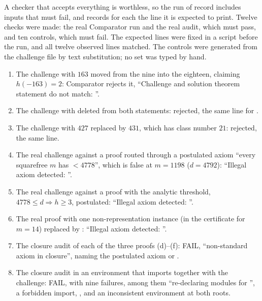 \documentclass[11pt]{article}
\theoremstyle{definition}
\begin{document}
{A checker that accepts everything is worthless, so the run of record includes inputs that must fail, and records for each the line it is expected to print. Twelve checks were made: the real Comparator run and the real audit, which must pass, and ten controls, which must fail. The expected lines were fixed in a script before the run, and all twelve observed lines matched. The controls were generated from the challenge file by text substitution; no set was typed by hand.
\begin{enumerate}[label=(\alph*),nosep]
\item The challenge with $163$ moved from the nine into the eighteen, claiming $h(-163) = 2$: Comparator rejects it, ``Challenge and solution theorem statement do not match: ''.
\item The challenge with  deleted from both statements: rejected, the same line for .
\item The challenge with $427$ replaced by $431$, which has class number $21$: rejected, the same line.
\item The real challenge against a proof routed through a postulated axiom ``every squarefree $m$ has  $< 4778$'', which is false at $m = 1198$ ($d = 4792$): ``Illegal axiom detected: ''.
\item The real challenge against a proof with the analytic threshold, $4778 \le d \Rightarrow h \ge 3$, postulated: ``Illegal axiom detected: ''.
\item The real proof with one non-representation instance (in the certificate for $m = 14$) replaced by : ``Illegal axiom detected: ''.
\item[(g--i)] The closure audit of each of the three proofs (d)--(f): FAIL, ``non-standard axiom in closure'', naming the postulated axiom or .
\item[(j)] The closure audit in an environment that imports  together with the challenge: FAIL, with nine failures, among them ``re-declaring modules for '', a forbidden import, , and an inconsistent environment at both roots.
\end{enumerate}

}
\end{document}
